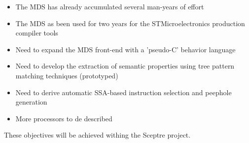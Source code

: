\documentclass[a4]{seminar}
\begin{document}
\begin{slide}


\begin{itemize}

\item The MDS has already accumulated several man-years of effort

\item The MDS as been used for two years for the STMicroelectronics production
compiler tools

\item Need to expand the MDS front-end with a 'pseudo-C' behavior language

\item Need to develop the extraction of semantic properties using tree pattern
matching techniques (prototyped)

\item Need to derive automatic SSA-based instruction selection and peephole
generation

\item More processors to de described

\end{itemize}

These objectives will be achieved withing the Sceptre project.

\end{slide}
\end{document}
